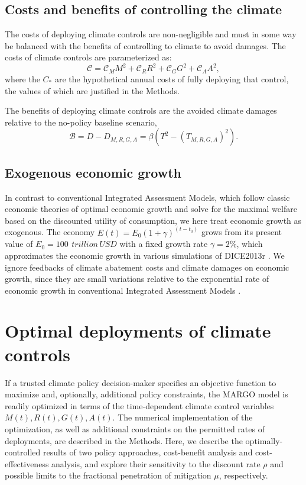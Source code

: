 \documentclass[9pt,twocolumn,twoside,lineno]{pnas-new}
\begin{document}
\subsection*{Costs and benefits of controlling the climate}

The costs of deploying climate controls are non-negligible and must in some way be balanced with the benefits of controlling to climate to avoid damages. The costs of climate controls are parameterized as:
\begin{equation}
    \mathcal{C} = \mathcal{C}_{M} M^{2} + \mathcal{C}_{R} R^{2} + \mathcal{C}_{G} G^{2} + \mathcal{C}_{A} A^{2},
\end{equation}
where the $C_{*}$ are the hypothetical annual costs of fully deploying that control, the values of which are justified in the Methods.

The benefits of deploying climate controls are the avoided climate damages relative to the no-policy baseline scenario,
\begin{equation}
    \mathcal{B} = D - D_{M,R,G,A} = \beta (T^{2} - (T_{M,R,G,A})^{2}).
\end{equation}

\subsection*{Exogenous economic growth}
In contrast to conventional Integrated Assessment Models, which follow classic economic theories of optimal economic growth and solve for the maximal welfare based on the discounted utility of consumption, we here treat economic growth as exogenous. The economy $E(t) = E_{0}(1 + \gamma)^{(t-t_{0})}$ grows from its present value of $E_{0} = \SI{100}{\,trillion\, USD}$ with a fixed growth rate $\gamma = 2\%$, which approximates the economic growth in various simulations of DICE2013r \cite{nordhaus2013dice}. We ignore feedbacks of climate abatement costs and climate damages on economic growth, since they are small variations relative to the exponential rate of economic growth in conventional Integrated Assessment Models \cite{nordhaus2013dice}.

\section*{Optimal deployments of climate controls}

If a trusted climate policy decision-maker specifies an objective function to maximize and, optionally, additional policy constraints, the MARGO model is readily optimized in terms of the time-dependent climate control variables $M(t), R(t), G(t), A(t)$. The numerical implementation of the optimization, as well as additional constraints on the permitted rates of deployments, are described in the Methods. Here, we describe the optimally-controlled results of two policy approaches, cost-benefit analysis and cost-effectiveness analysis, and explore their sensitivity to the discount rate $\rho$ and possible limits to the fractional penetration of mitigation $\mu$, respectively.
\end{document}
